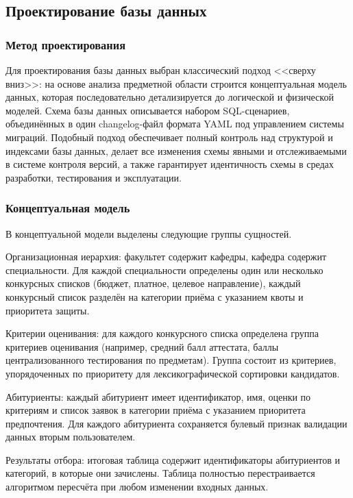 \subsection{Проектирование базы данных}

\subsubsection{Метод проектирования}

Для проектирования базы данных выбран классический подход <<сверху вниз>>: на основе анализа предметной области строится концептуальная модель данных, которая последовательно детализируется до логической и физической моделей.
Схема базы данных описывается набором SQL-сценариев, объединённых в один changelog-файл формата YAML под управлением системы миграций.
Подобный подход обеспечивает полный контроль над структурой и индексами базы данных, делает все изменения схемы явными и отслеживаемыми в системе контроля версий, а также гарантирует идентичность схемы в средах разработки, тестирования и эксплуатации.

\subsubsection{Концептуальная модель}

В концептуальной модели выделены следующие группы сущностей.

Организационная иерархия: факультет содержит кафедры, кафедра содержит специальности.
Для каждой специальности определены один или несколько конкурсных списков (бюджет, платное, целевое направление), каждый конкурсный список разделён на категории приёма с указанием квоты и приоритета защиты.

Критерии оценивания: для каждого конкурсного списка определена группа критериев оценивания (например, средний балл аттестата, баллы централизованного тестирования по предметам).
Группа состоит из критериев, упорядоченных по приоритету для лексикографической сортировки кандидатов.

Абитуриенты: каждый абитуриент имеет идентификатор, имя, оценки по критериям и список заявок в категории приёма с указанием приоритета предпочтения.
Для каждого абитуриента сохраняется булевый признак валидации данных вторым пользователем.

Результаты отбора: итоговая таблица содержит идентификаторы абитуриентов и категорий, в которые они зачислены.
Таблица полностью перестраивается алгоритмом пересчёта при любом изменении входных данных.

